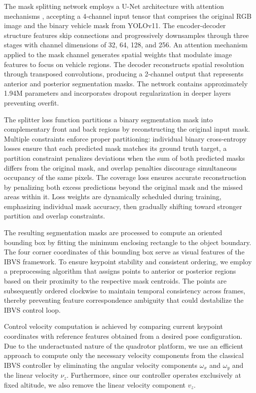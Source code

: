 \documentclass[10pt,twocolumn,letterpaper]{article}
\begin{document}
The mask splitting network employs a U-Net \cite{ronneberger2015unetconvolutionalnetworksbiomedical} architecture with attention mechanisms \cite{oktay2018attentionunetlearninglook}, accepting a 4-channel input tensor that comprises the original RGB image and the binary vehicle mask from YOLOv11. The encoder-decoder structure features skip connections and progressively downsamples through three stages with channel dimensions of 32, 64, 128, and 256. An attention mechanism applied to the mask channel generates spatial weights that modulate image features to focus on vehicle regions. The decoder reconstructs spatial resolution through transposed convolutions, producing a 2-channel output that represents anterior and posterior segmentation masks. The network contains approximately 1.94M parameters and incorporates dropout regularization in deeper layers preventing overfit.

The splitter loss function partitions a binary segmentation mask into complementary front and back regions by reconstructing the original input mask. Multiple constraints enforce proper partitioning: individual binary cross-entropy losses ensure that each predicted mask matches its ground truth target, a partition constraint penalizes deviations when the sum of both predicted masks differs from the original mask, and overlap penalties discourage simultaneous occupancy of the same pixels. The coverage loss ensures accurate reconstruction by penalizing both excess predictions beyond the original mask and the missed areas within it. Loss weights are dynamically scheduled during training, emphasizing individual mask accuracy, then gradually shifting toward stronger partition and overlap constraints.

The resulting segmentation masks are processed to compute an oriented bounding box by fitting the minimum enclosing rectangle to the object boundary. The four corner coordinates of this bounding box serve as visual features of the IBVS framework. To ensure keypoint stability and consistent ordering, we employ a preprocessing algorithm that assigns points to anterior or posterior regions based on their proximity to the respective mask centroids. The points are subsequently ordered clockwise to maintain temporal consistency across frames, thereby preventing feature correspondence ambiguity that could destabilize the IBVS control loop.

Control velocity computation is achieved by comparing current keypoint coordinates with reference features obtained from a desired pose configuration. Due to the underactuated nature of the quadrotor platform, we use an efficient approach to compute only the necessary velocity components from the classical IBVS controller by eliminating the angular velocity components $\omega_x$ and $\omega_y$ and the linear velocity $\nu_z$. Furthermore, since our controller operates exclusively at fixed altitude, we also remove the linear velocity component $v_z$. 
\end{document}
